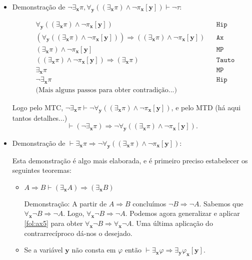\documentclass{report}
\theoremstyle{definition}
\theoremstyle{remark}
\renewcommand{\bf}[1]{\mathbf{#1}}
\newcommand{\imply}{\mathbin{\Rightarrow}}
\begin{document}
	\begin{itemize}
	\item Demonstração de $\neg\exists_{\bf x} \pi, \forall_{\bf y} ( (\exists_{\bf x} \pi) \land \neg \pi_{\bf x}[\bf y]) \vdash \neg \tau$:

	\begin{align*}
&\forall_{\bf y} ( (\exists_{\bf x} \pi) \land \neg \pi_{\bf x}[\bf y]) &&\mathtt{Hip}\\
&\left(\forall_{\bf y} ( (\exists_{\bf x} \pi) \land \neg \pi_{\bf x}[\bf y])\right) \imply ( (\exists_{\bf x} \pi) \land \neg \pi_{\bf x}[\bf y]) &&\mathtt{Ax}\\
&(\exists_{\bf x} \pi) \land \neg \pi_{\bf x}[\bf y] &&\mathtt{MP}\\
&((\exists_{\bf x} \pi) \land \neg \pi_{\bf x}[\bf y]) \imply (\exists_{\bf x} \pi) &&\mathtt{Tauto}\\
&\exists_{\bf x} \pi &&\mathtt{MP}\\
&\neg \exists_{\bf x} \pi &&\mathtt{Hip}\\
&\text{(Mais alguns passos para obter contradição...)}
	\end{align*}

	Logo pelo MTC, $\neg\exists_{\bf x} \pi \vdash \neg \forall_{\bf y} ( (\exists_{\bf x} \pi) \land \neg \pi_{\bf x}[\bf y])$, e pelo MTD (há aqui tantos detalhes...)
\[\vdash (\neg\exists_{\bf x} \pi) \imply \neg \forall_{\bf y} ( (\exists_{\bf x} \pi) \land \neg \pi_{\bf x}[\bf y]).\]

	\item Demonstração de $\vdash \exists_{\bf x} \pi \imply \neg \forall_{\bf y} ( (\exists_{\bf x} \pi) \land \neg \pi_{\bf x}[\bf y])$:

	Esta demonstração é algo mais elaborada, e é primeiro preciso estabelecer os seguintes teoremas:

	\begin{itemize}
	\item $A \imply B \vdash (\exists_{\bf x} A) \imply (\exists_{\bf x} B)$
	
	Demonstração: A partir de $A \imply B$ concluímos $\neg B \imply \neg A$. Sabemos que $\forall_{\bf x} \neg B \imply \neg A$. Logo, $\forall_{\bf x} \neg B \imply \neg A$. Podemos agora generalizar e aplicar \eqref{fol:ax5} para obter $\forall_{\bf x} \neg B \imply \forall_{\bf x} \neg A$. Uma última aplicação do contrarrecíproco dá-nos o desejado.

	\item Se a variável $\bf y$ não consta em $\varphi$ então $\vdash \exists_{\bf x} \varphi \imply \exists_{\bf y} \varphi_{\bf x}[\bf y]$.


\end{itemize}
\end{itemize}
\end{document}
